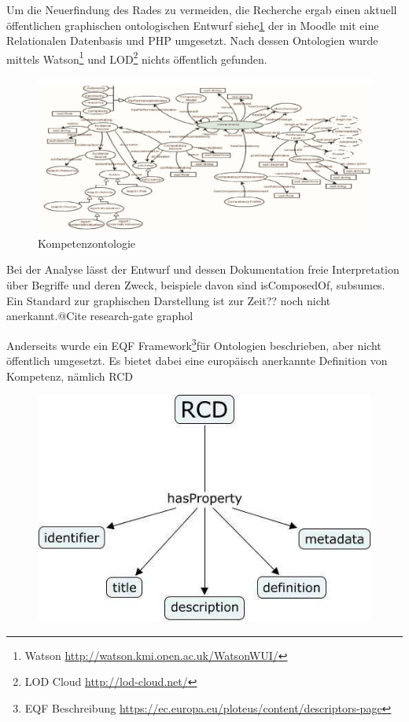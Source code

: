 \documentclass[
12pt,
english,
ngerman,
headsepline,
twoside,
openright,
numbers=noenddot,version=first
]{scrreprt}
\begin{document}
Um die Neuerfindung des Rades zu vermeiden, die Recherche ergab einen aktuell öffentlichen graphischen ontologischen Entwurf\cite{OntoMoodle} siehe\ref{fig:competence-ontology} der in Moodle mit eine Relationalen Datenbasis und PHP umgesetzt. Nach dessen Ontologien wurde mittels Watson\footnote{Watson \url{http://watson.kmi.open.ac.uk/WatsonWUI/}} und LOD\footnote{LOD Cloud \url{http://lod-cloud.net/}} nichts öffentlich gefunden. 

\begin{figure}[h]
	\centering
	\includegraphics[width=\linewidth]{pics/competency-ontology.png}
\caption{Kompetenzontologie}
\label{fig:competence-ontology}
\end{figure}

Bei der Analyse lässt der Entwurf und dessen Dokumentation freie Interpretation über Begriffe und deren Zweck, beispiele davon sind \glqq isComposedOf\grqq, \glqq subsumes\grqq. Ein Standard zur graphischen Darstellung ist zur Zeit?? noch nicht anerkannt.@Cite research-gate graphol

Anderseits wurde ein \glqq EQF Framework\footnote{EQF Beschreibung \url{https://ec.europa.eu/ploteus/content/descriptors-page}}\grqq für Ontologien beschrieben, aber nicht öffentlich umgesetzt. Es bietet dabei eine europäisch anerkannte Definition von Kompetenz, nämlich RCD\cite{EQFCompetency}


\begin{figure}
	\includegraphics[width=0.9\linewidth]{pics/RCD.jpg}
\end{figure}
\end{document}

